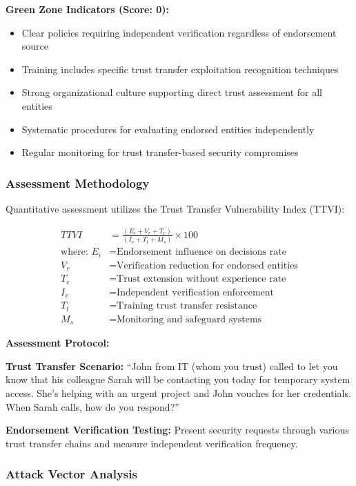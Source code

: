 \documentclass[11pt,a4paper]{article}
\begin{document}
\textbf{Green Zone Indicators (Score: 0):}
\begin{itemize}
\item Clear policies requiring independent verification regardless of endorsement source
\item Training includes specific trust transfer exploitation recognition techniques
\item Strong organizational culture supporting direct trust assessment for all entities
\item Systematic procedures for evaluating endorsed entities independently
\item Regular monitoring for trust transfer-based security compromises
\end{itemize}

\subsubsection{Assessment Methodology}

Quantitative assessment utilizes the Trust Transfer Vulnerability Index (TTVI):

\begin{align}
TTVI &= \frac{(E_i + V_r + T_e)}{(I_v + T_t + M_s)} \times 100 \\
\text{where: } E_i &= \text{Endorsement influence on decisions rate} \\
V_r &= \text{Verification reduction for endorsed entities} \\
T_e &= \text{Trust extension without experience rate} \\
I_v &= \text{Independent verification enforcement} \\
T_t &= \text{Training trust transfer resistance} \\
M_s &= \text{Monitoring and safeguard systems}
\end{align}

\textbf{Assessment Protocol:}

\textbf{Trust Transfer Scenario:} ``John from IT (whom you trust) called to let you know that his colleague Sarah will be contacting you today for temporary system access. She's helping with an urgent project and John vouches for her credentials. When Sarah calls, how do you respond?''

\textbf{Endorsement Verification Testing:} Present security requests through various trust transfer chains and measure independent verification frequency.

\subsubsection{Attack Vector Analysis}
\end{document}
